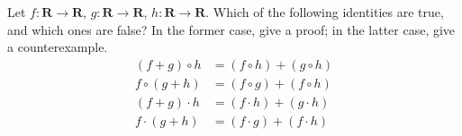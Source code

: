 \exercisesection

\begin{exercise}\label{ex 9.2.1}
    Let \(f : \mathbf{R} \to \mathbf{R}\), \(g : \mathbf{R} \to \mathbf{R}\), \(h : \mathbf{R} \to \mathbf{R}\).
    Which of the following identities are true, and which ones are false?
    In the former case, give a proof;
    in the latter case, give a counterexample.
    \begin{align*}
        (f + g) \circ h & = (f \circ h) + (g \circ h) \\
        f \circ (g + h) & = (f \circ g) + (f \circ h) \\
        (f + g) \cdot h & = (f \cdot h) + (g \cdot h) \\
        f \cdot (g + h) & = (f \cdot g) + (f \cdot h)
    \end{align*}
\end{exercise}


